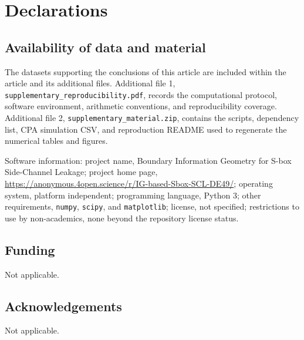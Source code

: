 \section*{Declarations}

\subsection*{Availability of data and material}

The datasets supporting the conclusions of this article are included within the
article and its additional files. Additional file 1,
\texttt{supplementary\_reproducibility.pdf}, records the computational
protocol, software environment, arithmetic conventions, and reproducibility
coverage. Additional file 2, \texttt{supplementary\_material.zip}, contains
the scripts, dependency list, CPA simulation CSV, and reproduction README used
to regenerate the numerical tables and figures.

Software information: project name, Boundary Information Geometry for S-box
Side-Channel Leakage; project home page,
\url{https://anonymous.4open.science/r/IG-based-Sbox-SCL-DE49/};
operating system, platform independent; programming language, Python 3; other
requirements, \texttt{numpy}, \texttt{scipy}, and \texttt{matplotlib};
license, not specified; restrictions to use by non-academics, none beyond the
repository license status.

\subsection*{Funding}

Not applicable.

\subsection*{Acknowledgements}

Not applicable.
